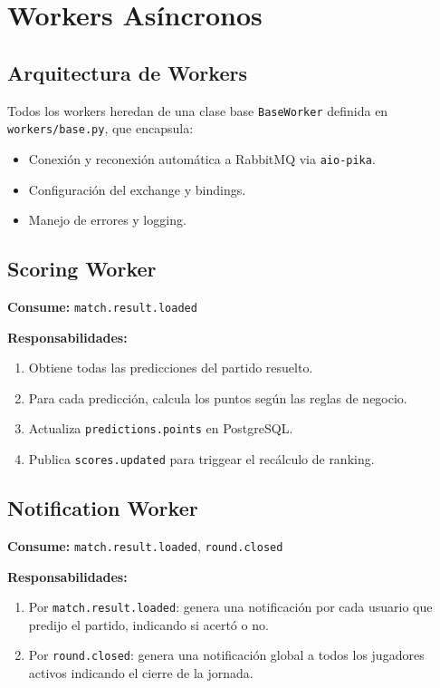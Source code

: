 \documentclass[12pt,a4paper]{article}
\newcommand{\code}[1]{\texttt{\small\color{navy}#1}}
\newcommand{\event}[1]{\texttt{\small\color{accent}#1}}
\begin{document}
\section{Workers Asíncronos}

\subsection{Arquitectura de Workers}

Todos los workers heredan de una clase base \code{BaseWorker} definida en
\code{workers/base.py}, que encapsula:
\begin{itemize}
  \item Conexión y reconexión automática a RabbitMQ via \code{aio-pika}.
  \item Configuración del exchange y bindings.
  \item Manejo de errores y logging.
\end{itemize}

\subsection{Scoring Worker}

\textbf{Consume:} \event{match.result.loaded}

\textbf{Responsabilidades:}
\begin{enumerate}
  \item Obtiene todas las predicciones del partido resuelto.
  \item Para cada predicción, calcula los puntos según las reglas de negocio.
  \item Actualiza \code{predictions.points} en PostgreSQL.
  \item Publica \event{scores.updated} para triggear el recálculo de ranking.
\end{enumerate}

\subsection{Notification Worker}

\textbf{Consume:} \event{match.result.loaded}, \event{round.closed}

\textbf{Responsabilidades:}
\begin{enumerate}
  \item Por \event{match.result.loaded}: genera una notificación por cada usuario que predijo
        el partido, indicando si acertó o no.
  \item Por \event{round.closed}: genera una notificación global a todos los jugadores
        activos indicando el cierre de la jornada.
\end{enumerate}
\end{document}
